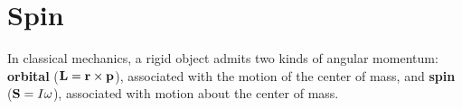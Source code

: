 \section{Spin}
In classical mechanics, a rigid object admits two kinds of angular momentum: \textbf{orbital} ($\vb{L}=\vb{r}\times\vb{p}$), associated with the motion of the center of mass, and \textbf{spin} ($\vb{S}=I\omega$), associated with motion about the center of mass.








